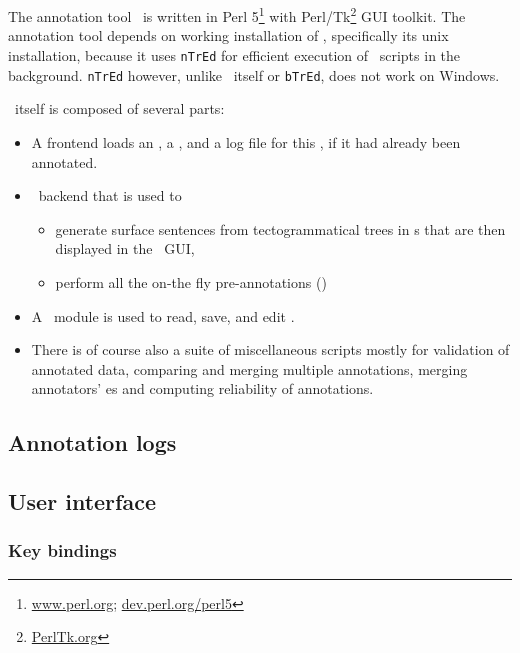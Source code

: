 
\chapter{\seman}
\label{sec:seman}
The annotation tool \seman\ is written in Perl 5\footnote{\url{www.perl.org}; \url{dev.perl.org/perl5}} with Perl/Tk\footnote{\url{PerlTk.org}} GUI toolkit. The annotation tool depends on working installation of \tred, specifically its unix installation, because it uses \texttt{nTrEd} for efficient execution of \tred\ scripts in the background. \texttt{nTrEd} however, unlike \tred\ itself or \texttt{bTrEd}, does not work on Windows.%

 \seman\ itself is composed of several parts:
\begin{itemize}
  \item A frontend loads an \sf, a \semlex,  and a log file for this \sf, if it had already been annotated. 
  \item \ntred\ backend that is used to 
	\begin{itemize}
	  \item generate surface sentences from tectogrammatical trees in \tf{}s that are then displayed in the \seman\ GUI,
	  \item perform all the on-the fly pre-annotations ()
	\end{itemize}
  \item A \semlex\ module is used to read, save, and edit \semlex.
  \item There is of course also a suite of miscellaneous scripts mostly for validation of annotated data, comparing and merging multiple annotations, merging annotators' \semlex{}es and computing reliability of annotations.
\end{itemize}

\section{Annotation logs}
\label{sec:logs}


\section{User interface}
\label{sec:seman:gui}

\subsection{Key bindings}

